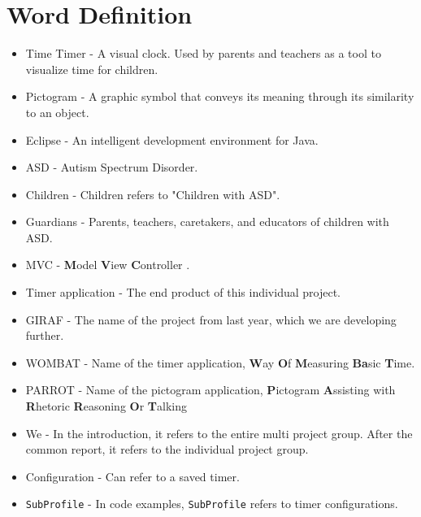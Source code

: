 \chapter*{Word Definition}

\begin{itemize}

	\item Time Timer - A visual clock. Used by parents and teachers as a tool to visualize time for children.
	\item Pictogram - A graphic symbol that conveys its meaning through its similarity to an object.
	\item Eclipse - An intelligent development environment for Java.
	\item ASD - Autism Spectrum Disorder.
	\item Children - Children refers to "Children with ASD".
	\item Guardians - Parents, teachers, caretakers, and educators of children with ASD.
	\item MVC - \textbf{M}odel \textbf{V}iew \textbf{C}ontroller \cite{MVC}.
	\item Timer application - The end product of this individual project.
	\item GIRAF - The name of the project from last year, which we are developing further.
	\item WOMBAT - Name of the timer application, \textbf{W}ay \textbf{O}f \textbf{M}easuring \textbf{Ba}sic \textbf{T}ime.
	\item PARROT - Name of the pictogram application, \textbf{P}ictogram \textbf{A}ssisting with \textbf{R}hetoric \textbf{R}easoning \textbf{O}r \textbf{T}alking
	\item We - In the introduction, it refers to the entire multi project group. After the common report, it refers to the individual project group.
	\item Configuration - Can refer to a saved timer.
	\item \texttt{SubProfile} - In code examples, \texttt{SubProfile} refers to timer configurations.

\end{itemize}